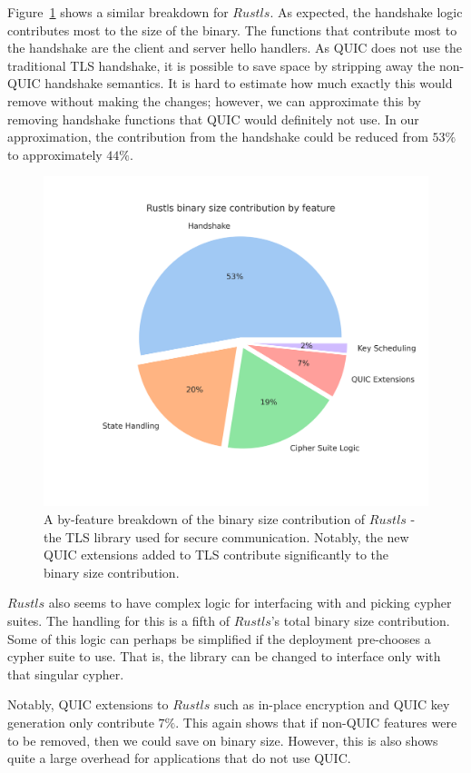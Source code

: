 Figure~\ref{fig:tls_bin_func} shows a similar breakdown for $Rustls$.
As expected, the handshake logic contributes most to the size of the binary.
The functions that contribute most to the handshake are the client and server hello handlers.
As QUIC does not use the traditional TLS handshake, it is possible to save space by stripping away the non-QUIC handshake semantics.
It is hard to estimate how much exactly this would remove without making the changes; however, we can approximate this by removing handshake functions that QUIC would definitely not use.
In our approximation, the contribution from the handshake could be reduced from $53\%$ to approximately $44\%$.

\begin{figure}[t]
    \centering
    \includegraphics[width=0.75\linewidth]{images/rustls_binary_by_function.png}
    \caption{A by-feature breakdown of the binary size contribution of $Rustls$ - the TLS library used for secure communication. Notably, the new QUIC extensions added to TLS contribute significantly to the binary size contribution.}
    \label{fig:tls_bin_func}
\end{figure}

$Rustls$ also seems to have complex logic for interfacing with and picking cypher suites.
The handling for this is a fifth of $Rustls$'s total binary size contribution.
Some of this logic can perhaps be simplified if the deployment pre-chooses a cypher suite to use.
That is, the library can be changed to interface only with that singular cypher.

Notably, QUIC extensions to $Rustls$ such as in-place encryption and QUIC key generation only contribute $7\%$.
This again shows that if non-QUIC features were to be removed, then we could save on binary size.
However, this is also shows quite a large overhead for applications that do not use QUIC.

